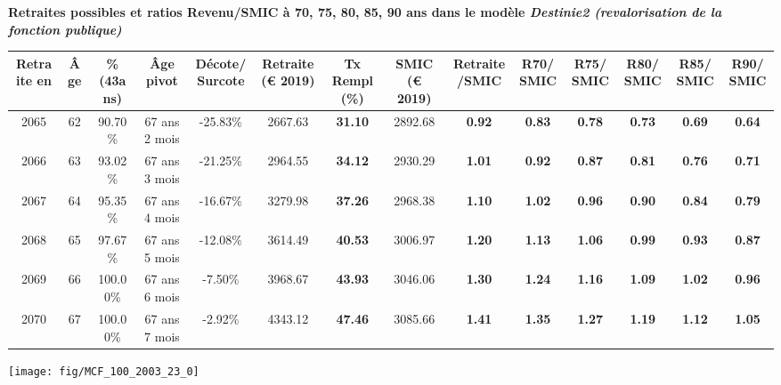  \vspace{0.1cm} 
{\bf \noindent Retraites possibles et ratios Revenu/SMIC à 70, 75, 80, 85, 90 ans dans le modèle \emph{Destinie2 (revalorisation de la fonction publique)}}  
 
\begin{adjustbox}{max width=\textwidth} 
\begin{tabular}[htb]{|c|c||c|c|c||c|c||c|c||c|c|c|c|c|} 
\hline 
 Retraite en &  Âge &  \%(43ans) &  Âge pivot &  Décote/Surcote &  Retraite (\euro{} 2019) &  Tx Rempl(\%) &  SMIC (\euro{} 2019) &  Retraite/SMIC &  R70/SMIC &  R75/SMIC &  R80/SMIC &  R85/SMIC &  R90/SMIC \\ 
\hline \hline 
 2065 &  62 &  90.70\% &  67 ans 2 mois &  -25.83\% &  2667.63 &  {\bf 31.10} &  2892.68 &  {\bf {\color{red} 0.92}} &  {\bf {\color{red} 0.83}} &  {\bf {\color{red} 0.78}} &  {\bf {\color{red} 0.73}} &  {\bf {\color{red} 0.69}} &  {\bf {\color{red} 0.64}} \\ 
\hline 
 2066 &  63 &  93.02\% &  67 ans 3 mois &  -21.25\% &  2964.55 &  {\bf 34.12} &  2930.29 &  {\bf 1.01} &  {\bf {\color{red} 0.92}} &  {\bf {\color{red} 0.87}} &  {\bf {\color{red} 0.81}} &  {\bf {\color{red} 0.76}} &  {\bf {\color{red} 0.71}} \\ 
\hline 
 2067 &  64 &  95.35\% &  67 ans 4 mois &  -16.67\% &  3279.98 &  {\bf 37.26} &  2968.38 &  {\bf 1.10} &  {\bf 1.02} &  {\bf {\color{red} 0.96}} &  {\bf {\color{red} 0.90}} &  {\bf {\color{red} 0.84}} &  {\bf {\color{red} 0.79}} \\ 
\hline 
 2068 &  65 &  97.67\% &  67 ans 5 mois &  -12.08\% &  3614.49 &  {\bf 40.53} &  3006.97 &  {\bf 1.20} &  {\bf 1.13} &  {\bf 1.06} &  {\bf {\color{red} 0.99}} &  {\bf {\color{red} 0.93}} &  {\bf {\color{red} 0.87}} \\ 
\hline 
 2069 &  66 &  100.00\% &  67 ans 6 mois &  -7.50\% &  3968.67 &  {\bf 43.93} &  3046.06 &  {\bf 1.30} &  {\bf 1.24} &  {\bf 1.16} &  {\bf 1.09} &  {\bf 1.02} &  {\bf {\color{red} 0.96}} \\ 
\hline 
 2070 &  67 &  100.00\% &  67 ans 7 mois &  -2.92\% &  4343.12 &  {\bf 47.46} &  3085.66 &  {\bf 1.41} &  {\bf 1.35} &  {\bf 1.27} &  {\bf 1.19} &  {\bf 1.12} &  {\bf 1.05} \\ 
\hline 
\hline 
\end{tabular} 
\end{adjustbox} 
 
 \vspace{0.1cm} 

 {\hspace{-2.2cm}\texttt{[image: fig/MCF\_100\_2003\_23\_0]}} 

